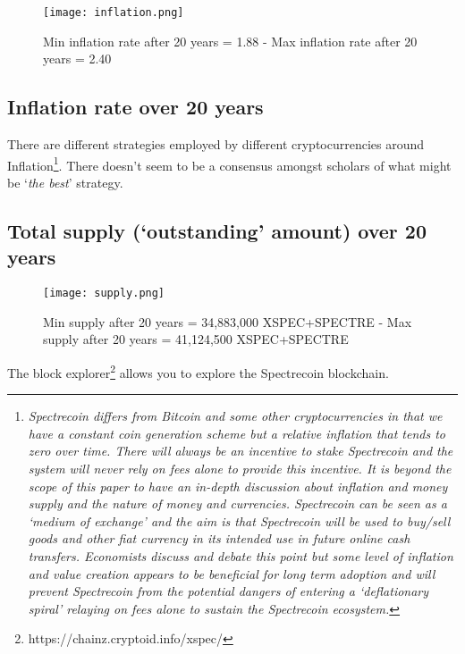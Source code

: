 \begin{figure}
	\centering
	\texttt{[image: inflation.png]}
	\caption{Min inflation rate after 20 years = 1.88 - Max inflation 
	rate after 20 years = 2.40 }
\end{figure}



\subsection{Inflation rate over 20 years}



There are different strategies employed by different cryptocurrencies around 
Inflation\footnote{\textit{Spectrecoin differs from Bitcoin and some other 
cryptocurrencies in that we have a constant coin generation scheme 
but a relative inflation that tends to zero over time. There will 
always be an incentive to stake Spectrecoin and the system will never 
rely on fees alone to provide this incentive. It is beyond the scope 
of this paper to have an in-depth discussion about inflation and money 
supply and the nature of money and currencies. Spectrecoin can be seen 
as a ‘medium of exchange’ and the aim is that Spectrecoin will be used 
to buy/sell goods and other fiat currency in its intended use in future 
online cash transfers. Economists discuss and debate this point but some 
level of inflation and value creation appears to be beneficial for long 
term adoption and will prevent Spectrecoin from the potential dangers of 
entering a ‘deflationary spiral’ relaying on fees alone to sustain the 
Spectrecoin ecosystem.}}. There doesn’t seem to be a consensus amongst 
scholars of what might be ‘\textit{the best}’ strategy.



\subsection{Total supply (‘outstanding’ amount) over 20 years}


\begin{figure}[ht]
	\centering
	\texttt{[image: supply.png]}
	\caption{Min supply after 20 years = 34,883,000 XSPEC+SPECTRE - Max 
		supply after 20 years = 41,124,500 XSPEC+SPECTRE}
\end{figure}



The block explorer\footnote{https://chainz.cryptoid.info/xspec/} allows you 
to explore the Spectrecoin blockchain.




